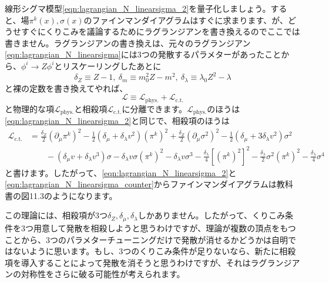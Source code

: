 \documentclass[unicode,a4paper,11pt]{ltjsarticle}
\theoremstyle{definition}
\begin{document}
線形シグマ模型\eqref{eqn:lagrangian_N_linearsigma_2}を量子化しましょう。すると、場$\pi^{k}(x),\sigma(x)$のファインマンダイアグラムはすぐに求まります、が、どうせすぐにくりこみを議論するためにラグランジアンを書き換えるのでここでは書きません。ラグランジアンの書き換えは、元々のラグランジアン\eqref{eqn:lagrangian_N_linearsigma}には3つの発散するパラメターがあったことから、$\phi^{i}\rightarrow Z\phi^{i}$とリスケーリングしたあとに
\begin{equation}
   \delta_{Z}
   \equiv
   Z-1
   ,\
   \delta_{m}
   \equiv
   m_{0}^2Z-m^2
   ,\
   \delta_{\lambda}
   \equiv
   \lambda_{0}Z^2
   -
   \lambda
\end{equation}
と裸の定数を書き換えてやれば、
\begin{equation}
   \mathcal{L}
   \equiv
   \mathcal{L}_{\mathrm{phys.}}+\mathcal{L}_{\mathrm{c.t.}}
\end{equation}
と物理的な項$\mathcal{L}_{\mathrm{phys.}}$と相殺項$\mathcal{L}_{\mathrm{c.t.}}$に分離できます。$\mathcal{L}_{\mathrm{phys.}}$のほうは\eqref{eqn:lagrangian_N_linearsigma_2}と同じで、相殺項のほうは
\begin{align}
   \mathcal{L}_{\mathrm{c.t.}}
    & =
   \frac{\delta_{Z}}{2}(\partial_{\mu}\pi^{k})^2
   -
   \frac{1}{2}(\delta_{\mu}+\delta_{\lambda}v^2)(\pi^{k})^2
   +
   \frac{\delta_{Z}}{2}(\partial_{\mu}\sigma^2)^2
   -
   \frac{1}{2}(\delta_{\mu}+3\delta_{\lambda}v^2)\sigma^2
   \nonumber
   \\
    & \qquad
   -
   (\delta_{\mu}v+\delta_{\lambda}v^3)\sigma
   -
   \delta_{\lambda}v\sigma(\pi^{k})^2
   -
   \delta_{\lambda}v\sigma^3
   -
   \frac{\delta_{\lambda}}{4}[(\pi^{k})^2]^2
   -
   \frac{\delta_{\lambda}}{2}\sigma^{2}(\pi^{k})^2
   -
   \frac{\delta_{\lambda}}{4}\sigma^4
   \label{eqn:lagrangian_N_linearsigma_counter}
\end{align}
と書けます。したがって、\eqref{eqn:lagrangian_N_linearsigma_2}と\eqref{eqn:lagrangian_N_linearsigma_counter}からファインマンダイアグラムは教科書の図11.3のようになります。

この理論には、相殺項が3つ$\delta_{Z},\delta_{\mu},\delta_{\lambda}$しかありません。したがって、くりこみ条件を3つ用意して発散を相殺しようと思うわけですが、理論が複数の頂点をもつことから、3つのパラメターチューニングだけで発散が消せるかどうかは自明ではないように思います。もし、3つのくりこみ条件が足りないなら、新たに相殺項を導入することによって発散を消そうと思うわけですが、それはラグランジアンの対称性をさらに破る可能性が考えられます。
\end{document}
